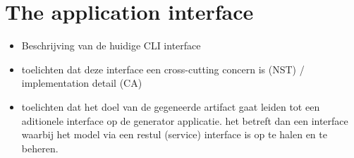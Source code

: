 \section{The application interface} \label{sec:artifact_application_interface}

\begin{itemize}
    \item Beschrijving van de huidige CLI interface
    \item toelichten dat deze interface een cross-cutting concern is (NST) / implementation detail
    (CA)
    \item toelichten dat het doel van de gegeneerde artifact gaat leiden tot een aditionele
    interface op de generator applicatie. het betreft dan een interface waarbij het model via
    een restul (service) interface is op te halen en te beheren.
\end{itemize}